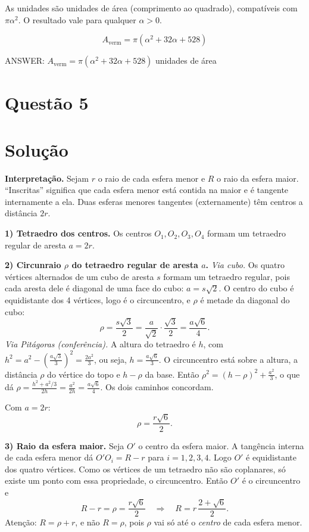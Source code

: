 \documentclass{article}%
\begin{document}
As unidades são unidades de área (comprimento ao quadrado), compatíveis com $\pi\alpha^2$. O resultado vale para qualquer $\alpha>0$.

\[
\boxed{A_{\text{verm}}=\pi\left(\alpha^{2}+32\alpha+528\right)}
\]

ANSWER: $A_{\text{verm}}=\pi\left(\alpha^{2}+32\alpha+528\right)$ unidades de área%
\newpage%
\section*{Questão 5}

\section*{Solução}

\textbf{Interpretação.} Sejam $r$ o raio de cada esfera menor e $R$ o raio da esfera maior. ``Inscritas'' significa que cada esfera menor está contida na maior e é tangente internamente a ela. Duas esferas menores tangentes (externamente) têm centros a distância $2r$.

\textbf{1) Tetraedro dos centros.} Os centros $O_1,O_2,O_3,O_4$ formam um tetraedro regular de aresta $a=2r$.

\textbf{2) Circunraio $\rho$ do tetraedro regular de aresta $a$.}
\emph{Via cubo.} Os quatro vértices alternados de um cubo de aresta $s$ formam um tetraedro regular, pois cada aresta dele é diagonal de uma face do cubo: $a=s\sqrt2$. O centro do cubo é equidistante dos 4 vértices, logo é o circuncentro, e $\rho$ é metade da diagonal do cubo:
\[
\rho=\frac{s\sqrt3}{2}=\frac{a}{\sqrt2}\cdot\frac{\sqrt3}{2}=\frac{a\sqrt6}{4}.
\]
\emph{Via Pitágoras (conferência).} A altura do tetraedro é $h$, com $h^2=a^2-\left(\frac{a\sqrt3}{3}\right)^2=\frac{2a^2}{3}$, ou seja, $h=\frac{a\sqrt6}{3}$. O circuncentro está sobre a altura, a distância $\rho$ do vértice do topo e $h-\rho$ da base. Então $\rho^2=(h-\rho)^2+\frac{a^2}{3}$, o que dá $\rho=\frac{h^2+a^2/3}{2h}=\frac{a^2}{2h}=\frac{a\sqrt6}{4}$. Os dois caminhos concordam.

Com $a=2r$:
\[
\rho=\frac{r\sqrt6}{2}.
\]

\textbf{3) Raio da esfera maior.} Seja $O'$ o centro da esfera maior. A tangência interna de cada esfera menor dá $O'O_i=R-r$ para $i=1,2,3,4$. Logo $O'$ é equidistante dos quatro vértices. Como os vértices de um tetraedro não são coplanares, só existe um ponto com essa propriedade, o circuncentro. Então $O'$ é o circuncentro e
\[
R-r=\rho=\frac{r\sqrt6}{2}\quad\Longrightarrow\quad R=r\,\frac{2+\sqrt6}{2}.
\]
Atenção: $R=\rho+r$, e não $R=\rho$, pois $\rho$ vai só até o \emph{centro} de cada esfera menor.
\end{document}
